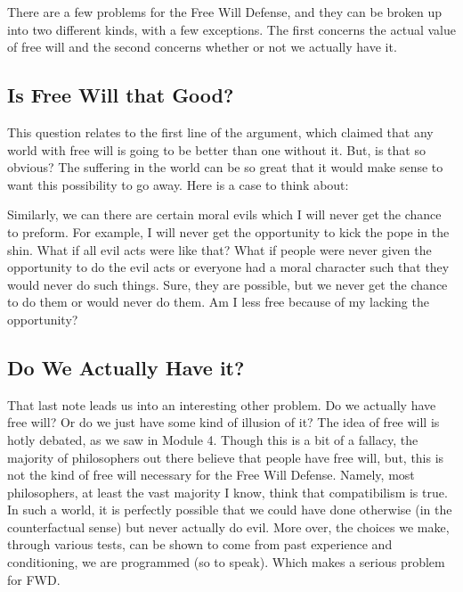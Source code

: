 There are a few problems for the Free Will Defense, and they can be broken up into two different kinds, with a few exceptions. The first concerns the actual value of free will and the second concerns whether or not we actually have it. 
\subsection{Is Free Will that Good?}

This question relates to the first line of the argument, which claimed that any world with free will is going to be better than one without it. But, is that so obvious? The suffering in the world can be so great that it would make sense to want this possibility to go away. Here is a case to think about:


Similarly, we can there are certain moral evils which I will never get the chance to preform. For example, I will never get the opportunity to kick the pope in the shin. What if all evil acts were like that? What if people were never given the opportunity to do the evil acts or everyone had a moral character such that they would never do such things. Sure, they are possible, but we never get the chance to do them or would never do them. Am I less free because of my lacking the opportunity?
\subsection{Do We Actually Have it?}

That last note leads us into an interesting other problem. Do we actually have free will? Or do we just have some kind of illusion of it? The idea of free will is hotly debated, as we saw in Module 4. Though this is a bit of a fallacy, the majority of philosophers out there believe that people have free will, but, this is not the kind of free will necessary for the Free Will Defense. Namely, most philosophers, at least the vast majority I know, think that compatibilism is true. In such a world, it is perfectly possible that we could have done otherwise (in the counterfactual sense) but never actually do evil. More over, the choices we make, through various tests, can be shown to come from past experience and conditioning, we are programmed (so to speak). Which makes a serious problem for FWD. 
